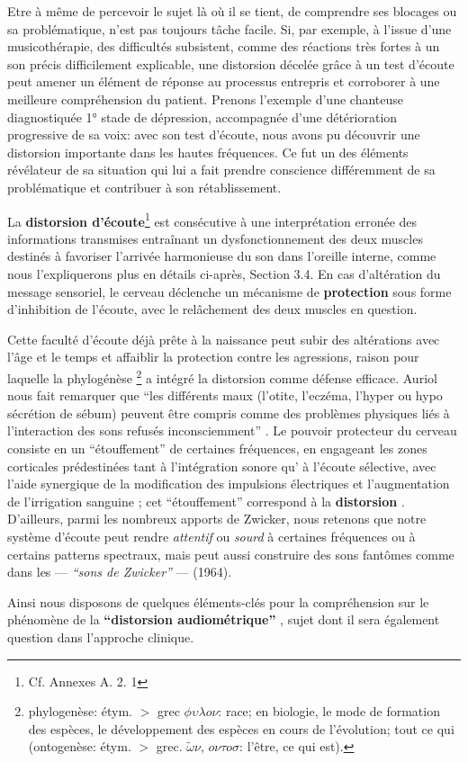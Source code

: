Etre à même de percevoir le sujet là où il se tient, de comprendre ses blocages ou sa problématique, 
n'est pas toujours tâche facile.
Si, par exemple, à l'issue d'une musicothérapie, des difficultés subsistent, comme des réactions très 
fortes à un son précis difficilement explicable,  une distorsion décelée grâce à un test 
d'écoute peut amener un élément de réponse au processus entrepris et corroborer à une meilleure  
compréhension du patient.   
Prenons  l'exemple d'une chanteuse diagnostiquée 1° stade de dépression, accompagnée d'une 
détérioration progressive de sa voix:  avec son test d'écoute, nous avons pu découvrir une distorsion 
importante dans les hautes fréquences. Ce fut un des éléments révélateur de sa situation qui lui a fait 
prendre conscience différemment  de sa problématique et contribuer à son rétablissement.


 La \textbf{distorsion d'écoute}\footnote{Cf. Annexes A. 2. 1}
 est consécutive à une interprétation
erronée des informations transmises entraînant un dysfonctionnement
des deux muscles destinés à favoriser l'arrivée
harmonieuse du son dans l'oreille interne, comme nous l'expliquerons plus en détails ci-après, Section 
3.4.
En cas d'altération du message sensoriel,
le cerveau déclenche un mécanisme de\textbf{ protection} sous forme
d'inhibition de l'écoute, avec le relâchement des deux muscles en
question. 

Cette faculté d'écoute déjà prête à la naissance peut subir des
altérations avec l'âge et
le temps et affaiblir la protection contre les agressions, raison pour
laquelle la phylogénèse \footnote{ phylogenèse: étym. $>$ grec $\phi
  \upsilon \lambda o \nu $: race; en biologie, le mode de formation des espèces, le développement
  des espèces en cours de l'évolution; tout ce qui (ontogenèse:
  étym. $>$ grec. $\tilde{\omega}\nu$, $o \nu \tau o
  \sigma$: l'être,
ce qui est).}  a intégré la distorsion comme défense
efficace.
Auriol nous fait
remarquer que
\enquote {les différents maux (l'otite, l'eczéma, l'hyper
ou hypo sécrétion de sébum) peuvent être compris comme des problèmes physiques liés à l'interaction des sons refusés
inconsciemment} \autocite [19--20] {auriol:cle}.
Le pouvoir protecteur du cerveau consiste en un  ``étouffement'' de
certaines fréquences,  en engageant les zones corticales prédestinées
tant à
l'intégration sonore qu' à l'écoute sélective,  avec l'aide synergique de la
modification des impulsions électriques et l'augmentation de
l'irrigation sanguine \autocite [14] {auriol:cle};
cet ``étouffement'' correspond à la \textbf{distorsion}
\autocite{tomatis:education}.
D'ailleurs,  parmi les nombreux apports de Zwicker, \autocite[p 84]{auriol:cle} nous retenons que notre 
système d'écoute peut rendre
\textit{attentif} ou\textit{ sourd} à certaines fréquences ou à certains patterns
spectraux, mais peut aussi construire des sons fantômes comme dans les --- \textit{``sons de 
Zwicker''} --- (1964).


Ainsi nous disposons de quelques éléments-clés pour la compréhension
sur le phénomène de la \textbf{``distorsion audiométrique''} \autocite
{auriol:cle}, sujet dont il sera également question dans l'approche
clinique.



